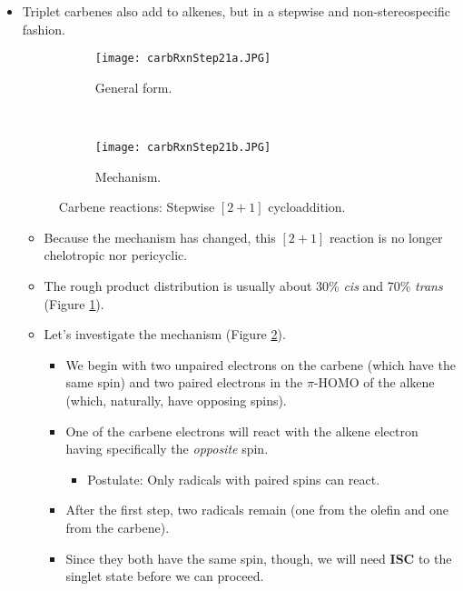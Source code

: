 \documentclass[../notes.tex]{subfiles}
\begin{document}
\begin{itemize}
\begin{itemize}
    \end{itemize}
    \item Triplet carbenes also add to alkenes, but in a stepwise and non-stereospecific fashion.
    \begin{figure}[H]
        \centering
        \begin{subfigure}[b]{0.5\linewidth}
            \centering
            \texttt{[image: carbRxnStep21a.JPG]}
            \caption{General form.}
            \label{fig:carbRxnStep21a}
        \end{subfigure}\\[1.5em]
        \begin{subfigure}[b]{0.75\linewidth}
            \centering
            \texttt{[image: carbRxnStep21b.JPG]}
            \caption{Mechanism.}
            \label{fig:carbRxnStep21b}
        \end{subfigure}
        \caption{Carbene reactions: Stepwise $[2+1]$ cycloaddition.}
        \label{fig:carbRxnStep21}
    \end{figure}
    \begin{itemize}
        \item Because the mechanism has changed, this $[2+1]$ reaction is no longer chelotropic nor pericyclic.
        \item The rough product distribution is usually about 30\% \emph{cis} and 70\% \emph{trans} (Figure \ref{fig:carbRxnStep21a}).
        \item Let's investigate the mechanism (Figure \ref{fig:carbRxnStep21b}).
        \begin{itemize}
            \item We begin with two unpaired electrons on the carbene (which have the same spin) and two paired electrons in the $\pi$-HOMO of the alkene (which, naturally, have opposing spins).
            \item One of the carbene electrons will react with the alkene electron having specifically the \emph{opposite} spin.
            \begin{itemize}
                \item Postulate: Only radicals with paired spins can react.
            \end{itemize}
            \item After the first step, two radicals remain (one from the olefin and one from the carbene).
            \item Since they both have the same spin, though, we will need \textbf{ISC} to the singlet state before we can proceed.

\end{itemize}
\end{itemize}
\end{itemize}
\end{document}
